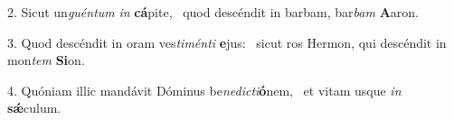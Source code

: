 2. Sicut un\textit{guén}\textit{tum} \textit{in} \textbf{cá}pite, \ast\  quod descéndit in barbam, bar\textit{bam} \textbf{A}aron.\

3. Quod descéndit in oram ves\textit{ti}\textit{mén}\textit{ti} \textbf{e}jus: \ast\  sicut ros Hermon, qui descéndit in mon\textit{tem} \textbf{Si}on.\

4. Quóniam illic mandávit Dóminus be\textit{ne}\textit{dic}\textit{ti}\textbf{ó}nem, \ast\  et vitam usque \textit{in} \textbf{sǽ}culum.\


